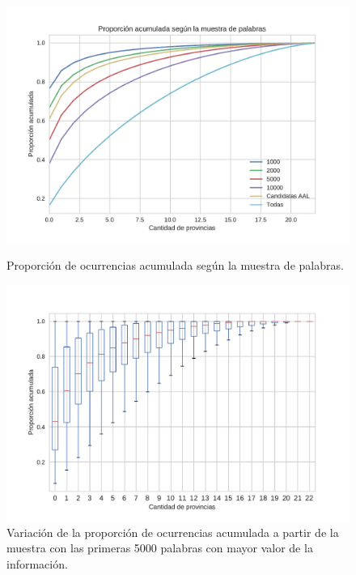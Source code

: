\begin{figure}[!ht]\centering
  \begin{minipage}{0.49\textwidth}
    \includegraphics[width=\linewidth]{./images/PropAcum.pdf}
    \caption{Proporción de ocurrencias acumulada según la muestra de palabras.} 
    \label{fig:propAcum} 
   \end{minipage}
   \begin{minipage}{0.49\textwidth}
    \includegraphics[width=\linewidth]{./images/PropAcum5000.pdf}
    \caption{Variación de la proporción de ocurrencias acumulada a partir de la muestra con las primeras 5000 palabras con mayor valor de la información.} 
    \label{fig:propAcum5000} 
   \end{minipage}
   
\end{figure}



